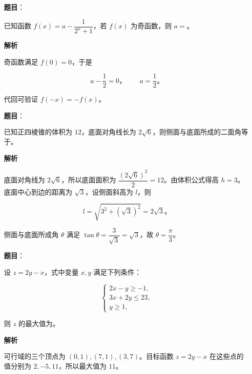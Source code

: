 \begin{answer}

\textbf{题目}：

已知函数 $f(x)=a-\dfrac1{2^x+1}$，若 $f(x)$ 为奇函数，则 $a=$\gkblank{}。

\textbf{解析}

奇函数满足 $f(0)=0$，于是

\nopagebreak[4]
\[
a-\frac12=0\text{，}\qquad a=\frac12\text{。}
\]

代回可验证 $f(-x)=-f(x)$。


\end{answer}
\begin{answer}

\textbf{题目}：

已知正四棱锥的体积为 $12$，底面对角线长为 $2\sqrt6$，则侧面与底面所成的二面角等于\gkblank{}。

\textbf{解析}

底面对角线为 $2\sqrt6$，所以底面面积为 $\dfrac{(2\sqrt6)^2}{2}=12$。由体积公式得高 $h=3$。底面中心到边的距离为 $\sqrt3$，设侧面斜高为 $l$，则

\nopagebreak[4]
\[
l=\sqrt{3^2+(\sqrt3)^2}=2\sqrt3\text{。}
\]

侧面与底面所成角 $\theta$ 满足 $\tan\theta=\dfrac3{\sqrt3}=\sqrt3$，故 $\theta=\dfrac\pi3$。


\end{answer}
\begin{answer}

\textbf{题目}：

设 $z=2y-x$，式中变量 $x,y$ 满足下列条件：

\nopagebreak[4]
\[
\begin{cases}
2x-y\geqslant-1,\\
3x+2y\leqslant23,\\
y\geqslant1,
\end{cases}
\]

则 $z$ 的最大值为\gkblank{}。

\textbf{解析}

可行域的三个顶点为 $(0,1),(7,1),(3,7)$。目标函数 $z=2y-x$ 在这些点的值分别为 $2,-5,11$，所以最大值为 $11$。


\end{answer}

